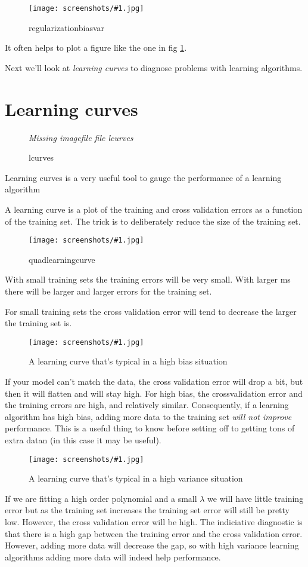 \documentclass[a4, 12pt, english, USenglish]{scrreprt}
\newcommand{\xscreenshot}[2]{
\begin{figure}[htb]
\begin{center}
\em Missing imagefile file #1
\end{center}
\label{#1}
\caption{#2}
\end{figure}}
\newcommand{\screenshot}[2]{
\begin{figure}[htb]
\texttt{[image: screenshots/\#1.jpg]}
\label{#1}
\caption{#2}
\end{figure}}
\newcommand{\idx}[1]{{\em #1}\index{#1}}
\begin{document}
\screenshot{regularizationbiasvar}{regularizationbiasvar}

It often helps to plot a figure like the one in fig \ref{regularizationbiasvar}.

Next we'll look at \idx{learning curves} to diagnose problems with
learning algorithms.

\section{Learning curves}


\xscreenshot{lcurves}{lcurves}

Learning curves is a very useful tool to gauge the performance of a
learning algorithm

A learning curve is a plot of the training and cross validation errors
as a function of the training set.  The trick is to deliberately
reduce the size of the training set.

\screenshot{quadlearningcurve}{quadlearningcurve}

With small training sets the training errors will be very small.
With larger ms there will be larger and larger errors for the training
set.

For small training sets the cross validation error will tend to
decrease the larger the training set is.


\screenshot{highbiaslearningcurve}{A learning curve that's typical in
  a high bias situation}

If your model can't match the data, the cross validation error will
drop a bit, but then it will flatten and will stay high.   For high
bias, the crossvalidation error and the training errors are high, and
relatively similar.   Consequently, if a learning algorithm has high
bias, adding more data to the training set {\em will  not improve}
performance.  This is a useful thing to know before setting off to
getting tons of extra datan (in this case it may be useful).

\screenshot{highvariancelearningcurve}{A learning curve that's typical
in a high variance situation}

If we are fitting a high order polynomial and a small \(\lambda\) we
will have little training error but as the training set increases the
training set error will still be pretty low.     However, the cross
validation error will be high.  The indiciative diagnostic is that
there is a high gap between the training error and the cross
validation error.  However, adding more data will decrease the gap, so
with high variance learning algorithms adding more data will indeed
help performance.
\end{document}
